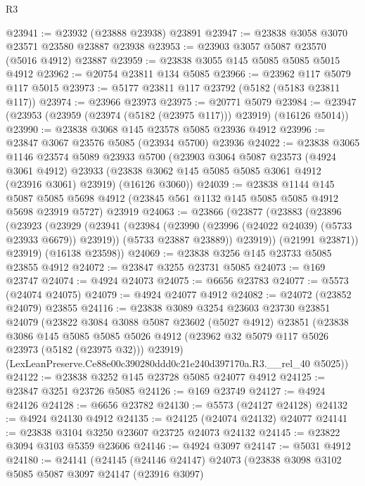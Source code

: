 \begin{lexlean}{R3}
\begin{coremodule}
@23941 := @23932 (@23888 @23938) @23891
@23947 := @23838 @3058 @3070 @23571 @23580 @23887 @23938
@23953 := @23903 @3057 @5087 @23570 (@5016 @4912) @23887
@23959 := @23838 @3055 @145 @5085 @5085 @5015 @4912
@23962 := @20754 @23811 @134 @5085
@23966 := @23962 @117 @5079 @117 @5015
@23973 := @5177 @23811 @117 @23792 (@5182 (@5183 @23811 @117))
@23974 := @23966 @23973
@23975 := @20771 @5079
@23984 := @23947 (@23953 (@23959 (@23974 (@5182 (@23975 @117))) @23919) (@16126 @5014))
@23990 := @23838 @3068 @145 @23578 @5085 @23936 @4912
@23996 := @23847 @3067 @23576 @5085 (@23934 @5700) @23936
@24022 := @23838
    @3065
    @1146
    @23574
    @5089
    @23933
    @5700
    (@23903
      @3064
      @5087
      @23573
      (@4924 @3061 @4912)
      @23933
      (@23838 @3062 @145 @5085 @5085 @3061 @4912 (@23916 @3061) @23919)
      (@16126 @3060))
@24039 := @23838
    @1144
    @145
    @5087
    @5085
    @5698
    @4912
    (@23845 @561 @1132 @145 @5085 @5085 @4912 @5698 @23919 @5727)
    @23919
@24063 := @23866
    (@23877
      (@23883
        (@23896
          (@23923
            (@23929
              (@23941
                (@23984 (@23990 (@23996 (@24022 @24039) (@5733 @23933 @6679)) @23919))
                (@5733 @23887 @23889))
              @23919))
          (@21991 @23871))
        @23919)
      (@16138 @23598))
@24069 := @23838 @3256 @145 @23733 @5085 @23855 @4912
@24072 := @23847 @3255 @23731 @5085
@24073 := @169 @23747
@24074 := @4924 @24073
@24075 := @6656 @23783
@24077 := @5573 (@24074 @24075)
@24079 := @4924 @24077 @4912
@24082 := @24072 (@23852 @24079) @23855
@24116 := @23838
    @3089
    @3254
    @23603
    @23730
    @23851
    @24079
    (@23822
      @3084
      @3088
      @5087
      @23602
      (@5027 @4912)
      @23851
      (@23838
        @3086
        @145
        @5085
        @5085
        @5026
        @4912
        (@23962 @32 @5079 @117 @5026 @23973 (@5182 (@23975 @32)))
        @23919)
      (LexLeanPreserve.Ce88e00c390280ddd0c21e240d397170a.R3.__rel_40 @5025))
@24122 := @23838 @3252 @145 @23728 @5085 @24077 @4912
@24125 := @23847 @3251 @23726 @5085
@24126 := @169 @23749
@24127 := @4924 @24126
@24128 := @6656 @23782
@24130 := @5573 (@24127 @24128)
@24132 := @4924 @24130 @4912
@24135 := @24125 (@24074 @24132) @24077
@24141 := @23838 @3104 @3250 @23607 @23725 @24073 @24132
@24145 := @23822 @3094 @3103 @5359 @23606
@24146 := @4924 @3097
@24147 := @5031 @4912
@24180 := @24141
    (@24145
      (@24146 @24147)
      @24073
      (@23838
        @3098
        @3102
        @5085
        @5087
        @3097
        @24147
        (@23916 @3097)

\end{coremodule}
\end{lexlean}
